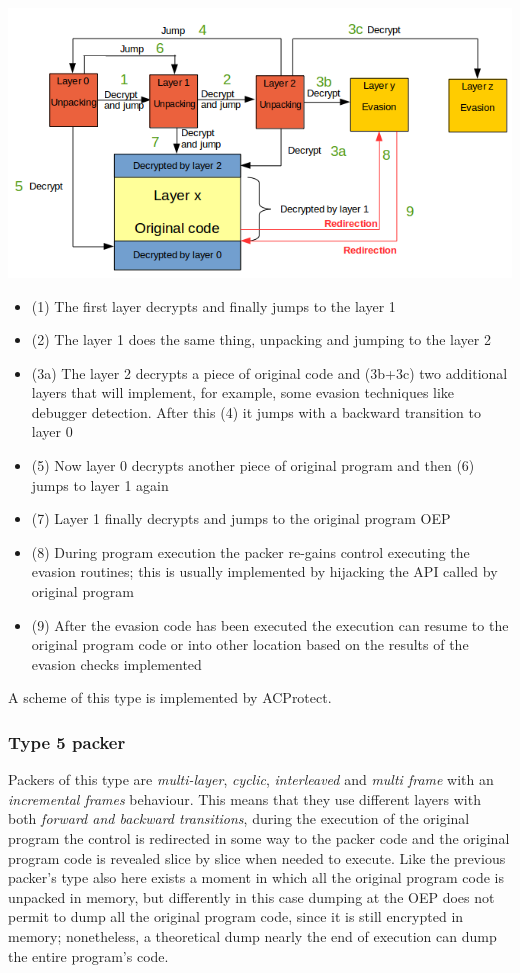 \includegraphics[width=1.07\textwidth]{pictures/packer_type_4.png} 

\begin{itemize}
\item (1) The first layer decrypts and finally jumps to the layer 1
\item (2) The layer 1 does the same thing, unpacking and jumping to the layer 2
\item (3a) The layer 2 decrypts a piece of original code and (3b+3c) two additional layers that will implement, for example, some evasion techniques like debugger detection. After this (4) it jumps with a backward transition to layer 0
\item (5) Now layer 0 decrypts another piece of original program and then (6) jumps to layer 1 again
\item (7) Layer 1 finally decrypts and jumps to the original program \ac{OEP}
\item (8) During program execution the packer re-gains control executing the evasion routines; this is usually implemented by hijacking the \ac{API} called by original program
\item (9) After the evasion code has been executed the execution can resume to the original program code or into other location based on the results of the evasion checks implemented
\end{itemize}

A scheme of this type is implemented by ACProtect.


\subsubsection{Type 5 packer}

Packers of this type are \textit{multi-layer}, \textit{cyclic}, \textit{interleaved} and \textit{multi frame} with an \textit{incremental frames} behaviour. This means that they use different layers with both \textit{forward and backward transitions}, during the execution of the original program the control is redirected in some way to the packer code and the original program code is revealed slice by slice when needed to execute. Like the previous packer's type also here exists a moment in which all the original program code is unpacked in memory, but differently in this case dumping at the \ac{OEP} does not permit to dump all the original program code, since it is still encrypted in memory; nonetheless, a theoretical dump nearly the end of execution can dump the entire program's code.

